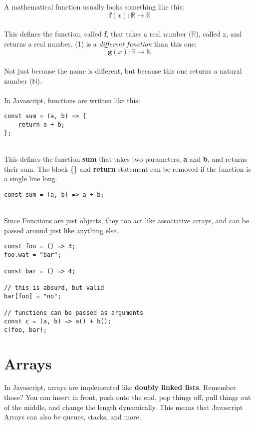 \documentclass{article}
\begin{document}
A mathematical function usually looks something like this:
\\
\begin{equation}
\textbf{f}(x):\mathbb{R}\rightarrow\mathbb{R}
\end{equation}
\\
This defines the function, called \textbf{f}, that takes a real number ($\mathbb{R}$), called x, and returns a real number. (1) is a \textit{different function} than this one:
\\
\begin{equation}
\textbf{g}(x):\mathbb{R}\rightarrow\mathbb{N}
\end{equation}
\\
Not just because the name is different, but because this one returns a natural number ($\mathbb{N}$).
\\
\\
In Javascript, functions are written like this:
\\
\begin{lstlisting}
const sum = (a, b) => {
	return a + b;
};
\end{lstlisting}

\noindent
\\
This defines the function \textbf{sum} that takes two parameters, \textbf{a} and \textbf{b}, and returns their sum. The block \{\} and \textbf{return} statement can be removed if the function is a single line long.
\\
\begin{lstlisting}
const sum = (a, b) => a + b;
\end{lstlisting}
\noindent
\\
Since Functions are just objects, they too act like associative arrays, and can be passed around just like anything else.
\\
\begin{lstlisting}
const foo = () => 3;
foo.wat = "bar";

const bar = () => 4;

// this is absurd, but valid
bar[foo] = "no";

// functions can be passed as arguments
const c = (a, b) => a() + b();
c(foo, bar);
\end{lstlisting}

\section{Arrays}

In Javascript, arrays are implemented like \textbf{doubly linked lists}. Remember those? You can insert in front, push onto the end, pop things off, pull things out of the middle, and change the length dynamically. This means that Javascript Arrays can also be queues, stacks, and more.
\end{document}
